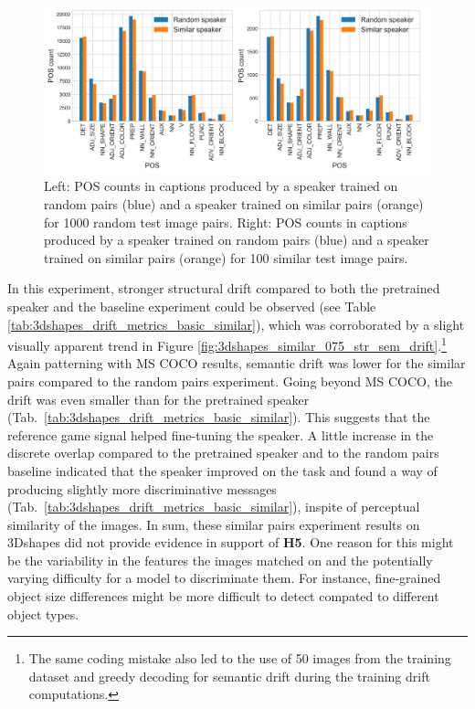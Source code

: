 \begin{figure}[h]
	\centering
	\includegraphics[width=\linewidth]{images/3dshapes_random_vs_similar_POS_counts.png}
	\caption{Left: POS counts in captions produced by a speaker trained on random pairs (blue) and a speaker trained on similar pairs (orange) for 1000 random test image pairs. Right: POS counts in captions produced by a speaker trained on random pairs (blue) and a speaker trained on similar pairs (orange) for 100 similar test image pairs. }
	\label{fig:3dshapes_pos}
\end{figure}

In this experiment, stronger structural drift compared to both the pretrained speaker and the baseline experiment could be observed (see Table \ref{tab:3dshapes_drift_metrics_basic_similar}), which was corroborated by a slight visually apparent trend in Figure \ref{fig:3dshapes_similar_075_str_sem_drift}.\footnote{The same coding mistake also led to the use of 50 images from the training dataset and greedy decoding for semantic drift during the training drift computations.} Again patterning with MS COCO results, semantic drift was lower for the similar pairs compared to the random pairs experiment. Going beyond MS COCO, the drift was even smaller than for the pretrained speaker (Tab.~\ref{tab:3dshapes_drift_metrics_basic_similar}). This suggests that the reference game signal helped fine-tuning the speaker.
A little increase in the discrete overlap compared to the pretrained speaker and to the random pairs baseline indicated that the speaker improved on the task and found a way of producing slightly more discriminative messages (Tab.~\ref{tab:3dshapes_drift_metrics_basic_similar}), inspite of perceptual similarity of the images. In sum, these similar pairs experiment results on 3Dshapes did not provide evidence in support of \textbf{H5}. One reason for this might be the variability in the features the images matched on and the potentially varying difficulty for a model to discriminate them. For instance, fine-grained object size differences might be more difficult to detect compated to different object types.

